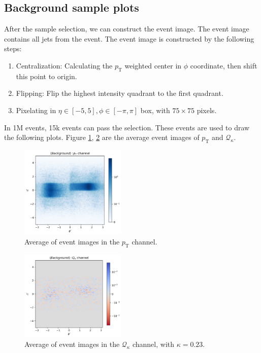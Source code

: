 \documentclass[12pt]{article}
\begin{document}
	\subsection{Background sample plots}%
	\label{sub:background_sample_plots}
		After the sample selection, we can construct the event image. The event image contains all jets from the event. The event image is constructed by the following steps:
		\begin{enumerate}
			\item Centralization: Calculating the $p_\text{T}$ weighted center in $\phi$ coordinate, then shift this point to origin.
			\item Flipping: Flip the highest intensity quadrant to the first quadrant. 
			\item Pixelating in $\eta \in [-5, 5],  \phi \in [-\pi, \pi]$ box, with $75\times 75$ pixels.
		\end{enumerate}

		In 1M events, 15k events can pass the selection. These events are used to draw the following plots. Figure \ref{fig:event_image_PT_background}, \ref{fig:event_image_Qk_background} are the average event images of $p_\text{T}$ and $\mathcal{Q}_\kappa$.
		\begin{figure}[htpb]
			\centering
			\includegraphics[width=0.45\textwidth]{event_image_PT-background.png}
			\caption{Average of event images in the $p_\text{T}$ channel.}
			\label{fig:event_image_PT_background}
		\end{figure}
		\begin{figure}[htpb]
			\centering
			\includegraphics[width=0.45\textwidth]{event_image_Qk-background.png}
			\caption{Average of event images in the $\mathcal{Q}_\kappa$ channel, with $\kappa = 0.23$.}
			\label{fig:event_image_Qk_background}
		\end{figure}
\end{document}
